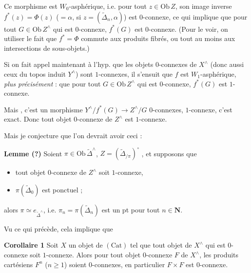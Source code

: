 \documentclass[11pt,a4paper]{article}
\begin{document}


Ce morphisme est $W_{0}$-asphérique, i.e. pour tout $z \in \mathrm{Ob}\,Z$, son
image inverse $f^{*}(z) = \Phi(z)$ ($= \alpha$, si
$z = (\widetilde{\Delta}_{n}, \alpha)$) est $0$-connexe, ce qui implique que
pour tout $G \in \mathrm{Ob}\,Z^{\wedge}$ qui est $0$-connexe,
\struck{\ill{}} $f^{*}(G)$ est $0$-connexe. (Pour le voir, on 
utiliser le fait que $f^{*} = \Phi$ commute aux produits fibrés, ou tout au
moins aux intersections de sous-objets.)

Si on fait appel maintenant à l'hyp. que les objets $0$-connexes de $X^{\wedge}$
(donc aussi ceux du topos induit $Y^{\wedge}$) sont $1$-connexes, il s'ensuit
que $f$ est $W_{1}$-asphérique, \emph{plus précisément} :  que pour
tout  $G \in \mathrm{Ob}\,Z^{\wedge}$ qui est $0$-connexe,
$f^{*}(G)$ est $1$-connexe.

Mais , c'est un morphisme
$Y^{\wedge}/f^{*}(G) \longrightarrow Z^{\wedge}/G$ \ill{} $0$-connexes,
\ill{}  $1$-connexe, \ill{} c'est exact. Donc \ill{} tout
objet $0$-connexe de $Z^{\wedge}$ est $1$-connexe.


Mais je conjecture que l'on devrait avoir ceci :

\textbf{Lemme (?)} Soient $\pi \in \mathrm{Ob}\,\widetilde{\Delta}^{\wedge}$,
$Z = (\widetilde{\Delta}_{/\pi})^{\circ}$ \ill{}, et supposons que

\begin{itemize}
\item[a)] tout objet $0$-connexe de $Z^{\wedge}$ soit $1$-connexe,
\item[b)] $\pi(\widetilde{\Delta}_{0})$ est ponctuel ;
\end{itemize}

alors $\pi \simeq e_{\widetilde{\Delta}^{\wedge}}$, i.e.
$\pi_{n} = \pi(\widetilde{\Delta}_{n})$ est un pt pour tout $n \in \mathbf{N}$.

Vu ce qui précède, cela implique que

\textbf{Corollaire 1} Soit $X$ un objet de $(\mathrm{Cat})$ tel que tout objet
de $X^{\wedge}$ qui est $0$-connexe soit $1$-connexe. Alors pour tout objet
$0$-connexe $F$ de $X^{\wedge}$, les produits cartésiens $F^{n}$ ($n \geq 1$)
soient $0$-connexes, en particulier $F \times F$ est $0$-connexe.
\end{document}
